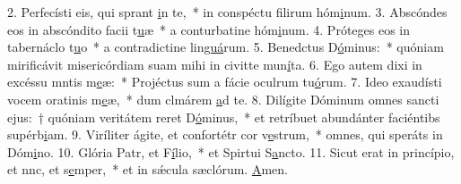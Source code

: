 2. Perfecísti eis, qui sprant \uline{i}n te,~* in conspéctu filirum hóm\uline{i}num.
3. Abscóndes eos in abscóndito facii t\uline{u}æ~* a conturbatine hóm\uline{i}num.
4. Próteges eos in tabernáclo t\uline{u}o~* a contradictine lin\uline{guá}rum.
5. Benedctus D\uline{ó}minus:~* quóniam mirificávit misericórdiam suam mihi in civitte mun\uline{í}ta.
6. Ego autem dixi in excéssu mntis m\uline{e}æ:~* Projéctus sum a fácie oculrum tu\uline{ó}rum.
7. Ideo exaudísti vocem oratinis m\uline{e}æ,~* dum clmárem \uline{a}d te.
8. Dilígite Dóminum omnes sancti ejus:~† quóniam veritátem reret D\uline{ó}minus,~* et retríbuet abundánter faciéntibs supérb\uline{i}am.
9. Viríliter ágite, et confortétr cor v\uline{e}strum,~* omnes, qui speráts in Dóm\uline{i}no.
10. Glória Patr, et F\uline{í}lio,~* et Spirtui S\uline{a}ncto.
11. Sicut erat in princípio, et nnc, et s\uline{e}mper,~* et in sǽcula sæclórum. \uline{A}men.
